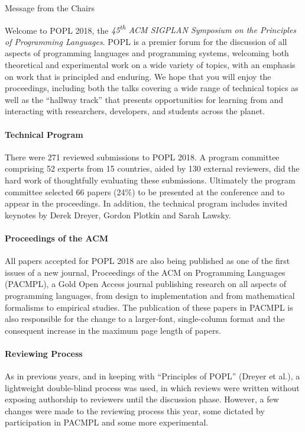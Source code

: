 \documentclass[11pt]{article}
\begin{document}
\begin{center}
\Large Message from the Chairs
\end{center}


\newcommand\person[1]{{#1}}

\noindent

Welcome to POPL 2018, the
\emph{45\textsuperscript{th} ACM SIGPLAN Symposium
on the Principles of Programming Languages}.
%
POPL is a premier forum for the discussion of all aspects
of programming languages and programming systems, welcoming
both theoretical and experimental work on a wide variety of
topics, with an emphasis on work that is principled and enduring.
%
We hope that you will enjoy the proceedings,
including both the talks covering a wide range
of technical topics as well as the ``hallway track''
that presents opportunities for learning from
and interacting with researchers, developers,
and students across the planet.


\paragraph{Technical Program}
%
There were 271 reviewed submissions to POPL 2018.
%
A program committee comprising 52 experts from 15 countries,
aided by 130 external reviewers, did the hard work of
thoughtfully evaluating these submissions.
%
Ultimately the program committee selected 66 papers (24\%)
to be presented at the conference and to appear in the
proceedings.
%
In addition, the technical program includes invited keynotes
by Derek Dreyer, Gordon Plotkin and Sarah Lawsky.

\paragraph{Proceedings of the ACM}
%
All papers accepted for POPL 2018 are also being published as one
of the first issues of a new journal, Proceedings of the ACM on
Programming Languages (PACMPL), a Gold Open Access journal publishing
research on all aspects of programming languages, from design to
implementation and from mathematical formalisms to empirical studies.
The publication of these papers in PACMPL is also responsible for
the change to a larger-font, single-column format and the consequent
increase in the maximum page length of papers.

\paragraph{Reviewing Process}
%
As in previous years, and in keeping with ``Principles of POPL'' (Dreyer et
al.), a lightweight double-blind process was used, in which reviews were
written without exposing authorship to reviewers until the discussion phase.
However, a few changes were made to the reviewing process this year,
some dictated by participation in PACMPL and some more experimental.
\end{document}
